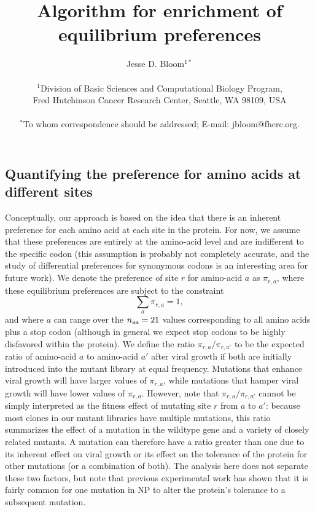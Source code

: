 \documentclass[12pt,draft]{article}
\title{Algorithm for enrichment of equilibrium preferences}
\author
{Jesse D. Bloom$^{1\ast}$\\
\\
\normalsize{$^{1}$Division of Basic Sciences and Computational Biology Program,}\\
\normalsize{Fred Hutchinson Cancer Research Center, Seattle, WA 98109, USA}\\
\\
\normalsize{$^\ast$To whom correspondence should be addressed; E-mail:  jbloom@fhcrc.org.}
}
\date{}
\newcommand{\naa}{\mbox{$n_{\rm{aa}}$}}
\newcommand{\pira}{\mbox{$\pi_{r,a}$}}
\newcommand{\piraprime}{\mbox{$\pi_{r,a'}$}}
\begin{document}
 

\maketitle

\subsection*{Quantifying the preference for amino acids at different sites}
Conceptually, our approach is based on the idea that there is an inherent preference for each amino acid at each site in the protein. For now, we assume that these preferences are entirely at the amino-acid level and are indifferent to the specific codon (this assumption is probably not completely accurate, and the study of differential preferences for  synonymous codons is an interesting area for future work). We denote the preference of site $r$ for amino-acid $a$ as \pira, where these equilibrium preferences are subject to the constraint
\begin{equation}
\label{eq:pirasum}
\sum\limits_{a} \pira = 1,
\end{equation}
and where $a$ can range over the $\naa = 21$ values corresponding to all amino acids plus a stop codon (although in general we expect stop codons to be highly disfavored within the protein). We define the ratio $\pira / \piraprime$ to be the expected ratio of amino-acid $a$ to amino-acid $a'$ after viral growth if both are initially introduced into the mutant library at equal frequency. Mutations that enhance viral growth will have larger values of \pira, while mutations that hamper viral growth will have lower values of \pira. However, note that $\pira / \piraprime$ cannot be simply interpreted as the fitness effect of mutating site $r$ from $a$ to $a'$: because most clones in our mutant libraries have multiple mutations, this ratio summarizes the effect of a mutation in the wildtype gene and a variety of closely related mutants. A mutation can therefore have a ratio greater than one due to its inherent effect on viral growth or its effect on the tolerance of the protein for other mutations (or a combination of both). The analysis here does not separate these two factors, but note that previous experimental work has shown that it is fairly common for one mutation in NP to alter the protein's tolerance to a subsequent mutation.
\end{document}
